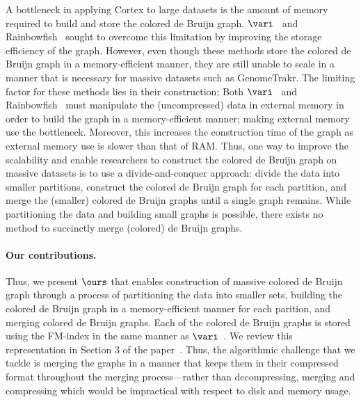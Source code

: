A bottleneck in applying Cortex to large datasets is the amount of memory required to build and store the colored de Bruijn graph.   $\vari$~\cite{vari} and Rainbowfish~\cite{rainbowfish} sought to overcome this limitation by improving the storage efficiency of the graph.  However, even though these methods store the colored de Bruijn graph in a memory-efficient manner, they are still unable to scale in a manner that is necessary for massive datasets such as GenomeTrakr.  The limiting factor for these methods  lies in their construction; Both $\vari$~\cite{vari} and Rainbowfish~\cite{rainbowfish} must manipulate the (uncompressed) data in external memory in order to build the graph in a memory-efficient manner; making  external memory use the bottleneck.  Moreover, this increases the construction time of the graph as external memory use is slower than that of RAM.  Thus, one way to improve the scalability and enable researchers to construct the colored de Bruijn graph on  massive datasets is to use a divide-and-conquer approach: divide the data into smaller partitions, construct the colored de Bruijn graph for each partition, and merge the (smaller) colored de Bruijn graphs until a single graph remains.  While partitioning the data and building small graphs is possible, there exists no method to succinctly merge (colored) de Bruijn graphs.


\paragraph{Our contributions.}  Thus, we present $\ours$ that enables construction of massive colored de Bruijn graph through a process of partitioning the data into smaller sets, building the colored de Bruijn graph in a memory-efficient manner for each parition, and merging colored de Bruijn graphs. Each of the colored de Bruijn graphs is stored using the FM-index in the same manner as $\vari$~\cite{vari}.  We review this representation in Section 3 of the paper~\cite{BOSS}.  Thus, the algorithmic challenge that we tackle is merging the graphs in a manner that keeps them in their compressed format throughout the merging process---rather than decompressing, merging and compressing which would be impractical with respect to disk and memory usage.  





